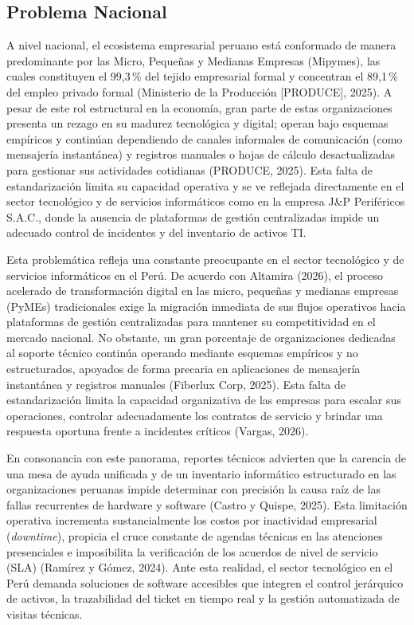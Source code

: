 \subsection{Problema Nacional}
A nivel nacional, el ecosistema empresarial peruano está conformado de manera predominante por las Micro, Pequeñas y Medianas Empresas (Mipymes), las cuales constituyen el 99,3\,\% del tejido empresarial formal y concentran el 89,1\,\% del empleo privado formal (Ministerio de la Producción [PRODUCE], 2025). A pesar de este rol estructural en la economía, gran parte de estas organizaciones presenta un rezago en su madurez tecnológica y digital; operan bajo esquemas empíricos y continúan dependiendo de canales informales de comunicación (como mensajería instantánea) y registros manuales o hojas de cálculo desactualizadas para gestionar sus actividades cotidianas (PRODUCE, 2025). Esta falta de estandarización limita su capacidad operativa y se ve reflejada directamente en el sector tecnológico y de servicios informáticos como en la empresa J\&P Periféricos S.A.C., donde la ausencia de plataformas de gestión centralizadas impide un adecuado control de incidentes y del inventario de activos TI.

Esta problemática refleja una constante preocupante en el sector tecnológico y de servicios informáticos en el Perú. De acuerdo con Altamira (2026), el proceso acelerado de transformación digital en las micro, pequeñas y medianas empresas (PyMEs) tradicionales exige la migración inmediata de sus flujos operativos hacia plataformas de gestión centralizadas para mantener su competitividad en el mercado nacional. No obstante, un gran porcentaje de organizaciones dedicadas al soporte técnico continúa operando mediante esquemas empíricos y no estructurados, apoyados de forma precaria en aplicaciones de mensajería instantánea y registros manuales (Fiberlux Corp, 2025). Esta falta de estandarización limita la capacidad organizativa de las empresas para escalar sus operaciones, controlar adecuadamente los contratos de servicio y brindar una respuesta oportuna frente a incidentes críticos (Vargas, 2026).

En consonancia con este panorama, reportes técnicos advierten que la carencia de una mesa de ayuda unificada y de un inventario informático estructurado en las organizaciones peruanas impide determinar con precisión la causa raíz de las fallas recurrentes de hardware y software (Castro y Quispe, 2025). Esta limitación operativa incrementa sustancialmente los costos por inactividad empresarial (\textit{downtime}), propicia el cruce constante de agendas técnicas en las atenciones presenciales e imposibilita la verificación de los acuerdos de nivel de servicio (SLA) (Ramírez y Gómez, 2024). Ante esta realidad, el sector tecnológico en el Perú demanda soluciones de software accesibles que integren el control jerárquico de activos, la trazabilidad del ticket en tiempo real y la gestión automatizada de visitas técnicas.

